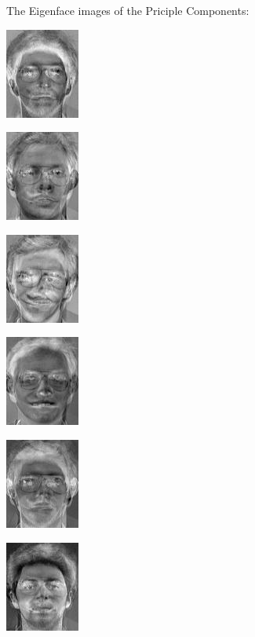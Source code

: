 \documentclass[a4paper]{article}
\begin{document}
The Eigenface images of the Priciple Components:

\includegraphics[scale=0.500000]{NewPrincComp0.jpg}

\includegraphics[scale=0.500000]{NewPrincComp1.jpg}

\includegraphics[scale=0.500000]{NewPrincComp2.jpg}

\includegraphics[scale=0.500000]{NewPrincComp3.jpg}

\includegraphics[scale=0.500000]{NewPrincComp4.jpg}

\includegraphics[scale=0.500000]{NewPrincComp5.jpg}
\end{document}
